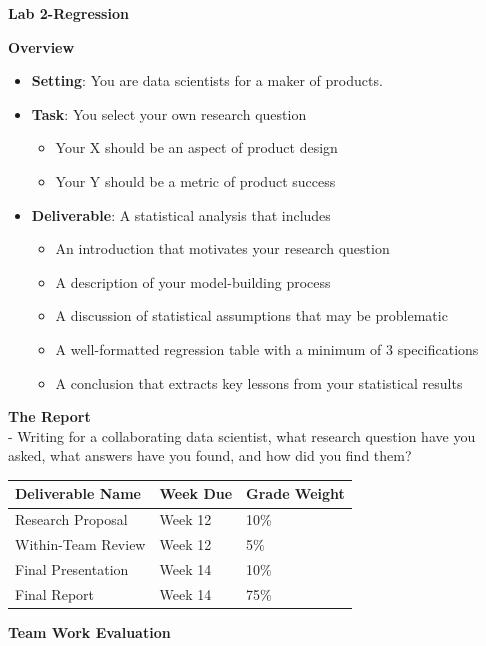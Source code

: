 \documentclass[
]{book}
\providecommand{\tightlist}{%
  \setlength{\itemsep}{0pt}\setlength{\parskip}{0pt}}
\theoremstyle{definition}
\theoremstyle{definition}
\theoremstyle{definition}
\theoremstyle{definition}
\theoremstyle{remark}
\begin{document}
\textbf{Lab 2-Regression}

\textbf{Overview}

\begin{itemize}
\tightlist
\item
  \textbf{Setting}: You are data scientists for a maker of products.
\item
  \textbf{Task}: You select your own research question

  \begin{itemize}
  \tightlist
  \item
    Your X should be an aspect of product design
  \item
    Your Y should be a metric of product success
  \end{itemize}
\item
  \textbf{Deliverable}: A statistical analysis that includes

  \begin{itemize}
  \tightlist
  \item
    An introduction that motivates your research question
  \item
    A description of your model-building process
  \item
    A discussion of statistical assumptions that may be problematic
  \item
    A well-formatted regression table with a minimum of 3 specifications
  \item
    A conclusion that extracts key lessons from your statistical results
  \end{itemize}
\end{itemize}

\textbf{The Report}\\
- Writing for a collaborating data scientist, what research question have you asked, what answers have you found, and how did you find them?

\begin{longtable}[]{@{}lll@{}}
\toprule
Deliverable Name & Week Due & Grade Weight \\
\midrule
\endhead
Research Proposal & Week 12 & 10\% \\
Within-Team Review & Week 12 & 5\% \\
Final Presentation & Week 14 & 10\% \\
Final Report & Week 14 & 75\% \\
\bottomrule
\end{longtable}

\textbf{Team Work Evaluation}
\end{document}
